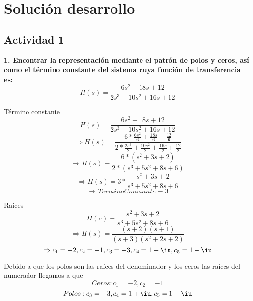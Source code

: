 \section{Solución desarrollo}
\subsection{Actividad 1}

\noindent\textbf{1. Encontrar la representación mediante el patrón de polos y ceros, así como el término constante del sistema cuya función de transferencia es:}
	\begin{equation}
		H(s)=\frac{6s^2+18s+12}{2s^3+10s^2+16s+12}
	\end{equation}
	\newline
	
	Término constante
	\begin{equation}
		H(s)=\frac{6s^2+18s+12}{2s^3+10s^2+16s+12}
	\end{equation}
	\begin{equation}
		\Rightarrow H(s)=\frac{6*\frac{6s^2}{6}+\frac{18s}{6}+\frac{12}{6}}{2*\frac{2s^3}{2}+\frac{10s^2}{2}+\frac{16s}{2}+\frac{12}{2}}
	\end{equation}
	\begin{equation}
		\Rightarrow H(s)=\frac{6*(s^2+3s+2)}{2*(s^3+5s^2+8s+6)}
	\end{equation}
	\begin{equation}
		\Rightarrow H(s)=3*\frac{s^2+3s+2}{s^3+5s^2+8s+6}
	\end{equation}	
	\begin{equation}
		\Rightarrow Termino Constante = 3
	\end{equation}
	
	Raíces
	\begin{equation}
		H(s)=\frac{s^2+3s+2}{s^3+5s^2+8s+6}
	\end{equation}	
	\begin{equation}
		\Rightarrow H(s)=\frac{(s+2)(s+1)}{(s+3)(s^2+2s+2)}
	\end{equation}		
	\begin{equation}
		\Rightarrow c_1=-2,c_2=-1,c_3=-3,c_4=1+\iu,c_5=1-\iu
	\end{equation}		
	
	\noindent Debido a que los polos son las raíces del denominador y los ceros las raíces del numerador llegamos a que
	\begin{equation}
		Ceros: c_1=-2,c_2=-1 
	\end{equation}		
	\begin{equation}
		Polos: c_3=-3,c_4=1+\iu,c_5=1-\iu
	\end{equation}
	\newline
	
